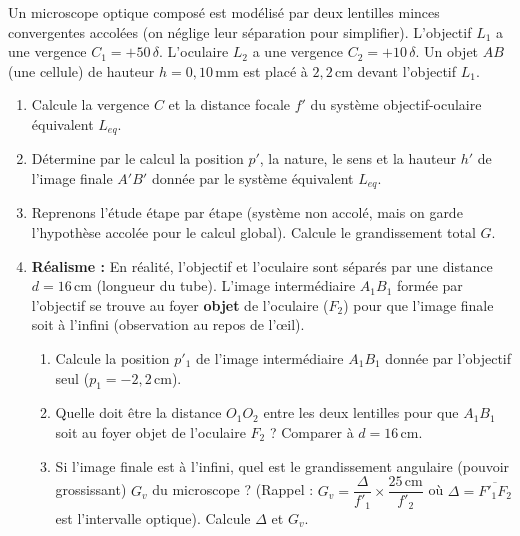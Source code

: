 \documentclass[11pt]{article}
\begin{document}
\begin{exercice}
Un microscope optique composé est modélisé par deux lentilles minces convergentes accolées (on néglige leur séparation pour simplifier).
L'objectif $L_1$ a une vergence $C_1 = +50\,\delta$. L'oculaire $L_2$ a une vergence $C_2 = +10\,\delta$.
Un objet $AB$ (une cellule) de hauteur $h = 0,10\,\text{mm}$ est placé à $2,2\,\text{cm}$ devant l'objectif $L_1$.
\begin{enumerate}
    \item Calcule la vergence $C$ et la distance focale $f'$ du système objectif-oculaire équivalent $L_{eq}$.
    \item Détermine par le calcul la position $p'$, la nature, le sens et la hauteur $h'$ de l'image finale $A'B'$ donnée par le système équivalent $L_{eq}$.
    \item Reprenons l'étude étape par étape (système non accolé, mais on garde l'hypothèse accolée pour le calcul global). Calcule le grandissement total $G$.
    \item \textbf{Réalisme :} En réalité, l'objectif et l'oculaire sont séparés par une distance $d = 16\,\text{cm}$ (longueur du tube). L'image intermédiaire $A_1B_1$ formée par l'objectif se trouve au foyer \textbf{objet} de l'oculaire ($F_2$) pour que l'image finale soit à l'infini (observation au repos de l'œil).
    \begin{enumerate}
        \item Calcule la position $p'_1$ de l'image intermédiaire $A_1B_1$ donnée par l'objectif seul ($p_1 = -2,2\,\text{cm}$).
        \item Quelle doit être la distance $O_1O_2$ entre les deux lentilles pour que $A_1B_1$ soit au foyer objet de l'oculaire $F_2$ ? Comparer à $d = 16\,\text{cm}$.
        \item Si l'image finale est à l'infini, quel est le grandissement angulaire (pouvoir grossissant) $G_v$ du microscope ? (Rappel : $G_v = \dfrac{\Delta}{f'_1} \times \dfrac{25\,\text{cm}}{f'_2}$ où $\Delta = \overline{F'_1F_2}$ est l'intervalle optique). Calcule $\Delta$ et $G_v$.
    \end{enumerate}
\end{enumerate}
\end{exercice}
\end{document}

